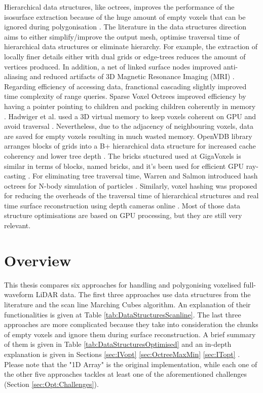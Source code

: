 \documentclass{subfiles}
\begin{document}
\par Hierarchical data structures, like octrees, improves the performance of the isosurface extraction because of the huge amount of empty voxels that can be ignored during polygonisation \cite{Wilhelms1990}. The literature in the data structures direction aims to either simplify/improve the output mesh, optimise traversal time of hierarchical data structures or eliminate hierarchy. For example, the extraction of locally finer details either with dual grids \cite{Scott2005} or edge-trees \cite{Wilhelms1992} reduces the amount of vertices produced. In addition, a net of linked surface nodes improved anti-aliasing and reduced artifacts of 3D Magnetic Resonance Imaging (MRI) \cite{Gibson1998}. Regarding efficiency of accessing data,  franctional cascading slightly improved time complexity of range queries\cite{Chazelle1986}. Sparse Voxel Octrees improved efficiency by having a pointer pointing to children and packing children coherently in memory \cite{Laine2011SparseOctrees}. Hadwiger et al. used a 3D virtual memory to keep voxels coherent on GPU and avoid traversal \cite{Hadwiger2012}. Nevertheless, due to the adjacency of neighbouring voxels, data are saved for empty voxels resulting in much wasted memory. OpenVDB library arranges blocks of grids into a B+ hierarchical data structure for increased cache coherency and lower tree depth \cite{Museth2013OpenVDB}. The bricks stuctured used at GigaVoxels is similar in terms of blocks, named bricks, and it's been used for efficient GPU ray-casting \cite{Crassin2009}. For eliminating tree traversal time, Warren and Salmon introduced hash octrees for N-body simulation of particles \cite{Warren1993hashedOctree}. Similarly, voxel hashing was proposed for reducing the overheads of the traversal time of hierarchical structures and real time surface reconstruction using depth cameras online \cite{Nievner2016voxelHashing}. Most of those data structure optimisations are based on GPU processing, but they are still very relevant.


\section{Overview}



\par This thesis compares six approaches for handling and polygonising voxelised full-waveform LiDAR data. The first three approaches use data structures from the literature and the scan line Marching Cubes algorithm. An explanation of their functionalities is given at Table \ref{tab:DataStructuresScanline}. The last three approaches are more complicated because they take into consideration the chunks of empty voxels and ignore them during surface reconstruction. A brief summary of them is given in Table \ref{tab:DataStructuresOptimised} and an in-depth explanation is given in Sections \ref{sec:IVopt} \ref{sec:OctreeMaxMin} \ref{sec:ITopt} . Please note that the "1D Array" is the original implementation, while each one of the other five approaches tackles at least one of the aforementioned challenges (Section \ref{sec:Opt:Challenges}). 
\end{document}
